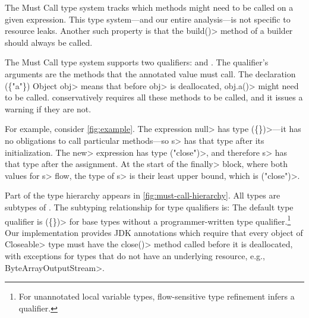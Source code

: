 
The Must Call type system tracks which methods might need to be called
on a given expression.  This type system---and
our entire analysis---is not specific to resource leaks. Another such
  property is that the
  \<build()> method of a builder~\cite{designpatterns} should always
  be called.

The Must Call type system supports two qualifiers: \MustCall and
\MustCallUnknown. The \MustCall qualifier's arguments are the
methods that
the annotated value
must call. The declaration
\MustCall\<(\{"a"\}) Object obj> means that before \<obj> is
deallocated, \<obj.a()> might need to be called.
\Tool conservatively requires all these methods to be called,
and it issues a warning if they are not.

For example, consider \cref{fig:example}. The expression \<null> has type
\MustCall\<(\{\})>---it has no obligations
to call particular methods---so \<s> has that type after its initialization.
The \<new> expression has type \MustCall\<("close")>, and therefore
\<s> has that type after the assignment.
At the start of the \<finally> block, where both values for \<s> flow,
the type of \<s> is their least upper bound, which is \MustCall\<("close")>.


Part of the type hierarchy appears in \cref{fig:must-call-hierarchy}.
All types are subtypes of \MustCallUnknown.
The subtyping relationship for \MustCall type qualifiers is:
The default type qualifier is \MustCall\<(\{\})> for base types without a
programmer-written type qualifier.\footnote{For unannotated local variable types,
  flow-sensitive type refinement infers a qualifier.}
Our implementation
provides JDK annotations which require that every 
object of \<Closeable> type must have the \<close()> method called before
it is deallocated, with exceptions for types that do not have an underlying
resource, e.g., \<ByteArrayOutputStream>.

